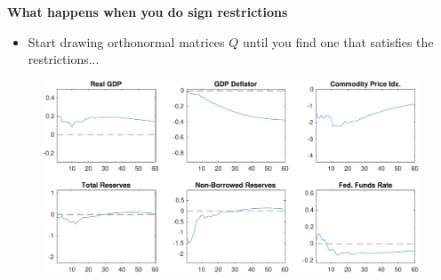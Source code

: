 \documentclass[10pt,english,t,aspectratio=169,ignorenonframetext]{beamer}
\begin{document}
\begin{frame}
\begin{itemize}
\begin{minipage}[b]{.9\textwidth}
\end{minipage}
\end{itemize}
\end{frame}


\begin{frame}
{\textbf{What happens when you do sign restrictions }}

\begin{itemize}
\item Start drawing orthonormal matrices $Q$ until you find one that
satisfies the restrictions...
\end{itemize}

\begin{figure}[h]
\vspace{.3cm}\includegraphics[width=.8\textwidth]{Uhlig_Replication_1rot.pdf}
\end{figure}
\end{frame}

\end{document}
